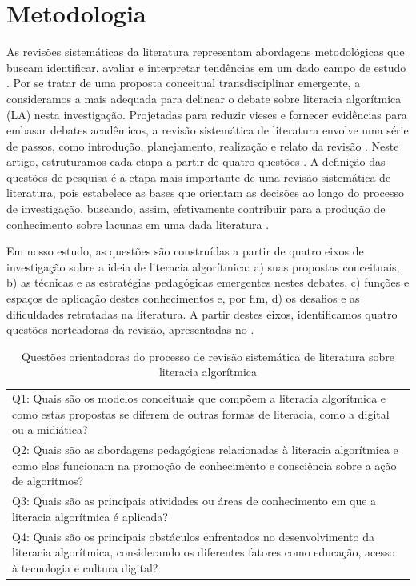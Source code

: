 \section{Metodologia}\label{sec-metodologia}

As revisões sistemáticas da literatura representam abordagens
metodológicas que buscam identificar, avaliar e interpretar tendências
em um dado campo de estudo \cite{Garcia-Penalvo2022}. Por se tratar de uma
proposta conceitual transdisciplinar emergente, a consideramos a mais
adequada para delinear o debate sobre literacia algorítmica (LA) nesta
investigação. Projetadas para reduzir vieses e fornecer evidências para
embasar debates acadêmicos, a revisão sistemática de literatura envolve
uma série de passos, como introdução, planejamento, realização e relato
da revisão \cite{White2005}. Neste artigo, estruturamos cada etapa
a partir de quatro questões . A definição das questões de
pesquisa é a etapa mais importante de uma revisão sistemática de
literatura, pois estabelece as bases que orientam as decisões ao longo
do processo de investigação, buscando, assim, efetivamente contribuir
para a produção de conhecimento sobre lacunas em uma dada literatura
\cite{Garcia-Penalvo2022}.

Em nosso estudo, as questões são construídas a partir de quatro eixos de
investigação sobre a ideia de literacia algorítmica: a) suas propostas
conceituais, b) as técnicas e as estratégias pedagógicas emergentes
nestes debates, c) funções e espaços de aplicação destes conhecimentos
e, por fim, d) os desafios e as dificuldades retratadas na literatura. A
partir destes eixos, identificamos quatro questões norteadoras da
revisão, apresentadas no .

\begin{table}[!htpb]
\centering
\begin{threeparttable}
\caption{Questões orientadoras do processo de revisão
sistemática de literatura sobre literacia algorítmica}
\label{tab-01}
\begin{tabular}{p{}}
\toprule
Q1: Quais são os modelos conceituais que compõem a literacia algorítmica
e como estas propostas se diferem de outras formas de literacia, como a
digital ou a midiática? \\
Q2: Quais são as abordagens pedagógicas relacionadas à literacia
algorítmica e como elas funcionam na promoção de conhecimento e
consciência sobre a ação de algoritmos? \\
Q3: Quais são as principais atividades ou áreas de conhecimento em que a
literacia algorítmica é aplicada? \\
Q4: Quais são os principais obstáculos enfrentados no desenvolvimento da
literacia algorítmica, considerando os diferentes fatores como educação,
acesso à tecnologia e cultura digital? \\
\bottomrule
\end{tabular}
\end{threeparttable}
\end{table}
    
